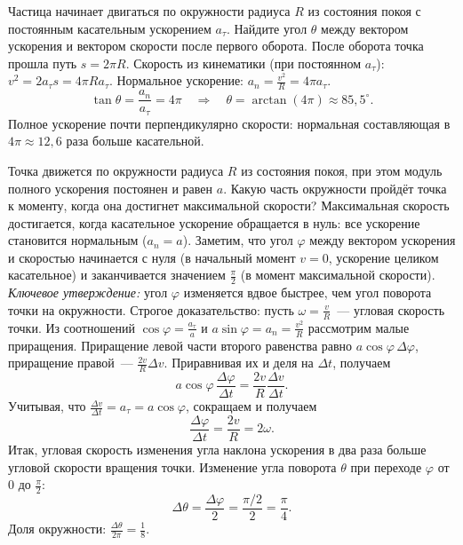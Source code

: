 \documentclass[../main.tex]{subfiles}
\begin{document}
\begin{example}
Частица начинает двигаться по окружности радиуса $R$ из состояния
покоя с постоянным касательным ускорением $a_\tau$.
Найдите угол $\theta$ между вектором ускорения и вектором скорости
после первого оборота.
После оборота точка прошла путь $s = 2\pi R$.
Скорость из кинематики (при постоянном $a_\tau$):
$v^2 = 2a_\tau s = 4\pi R a_\tau$.
Нормальное ускорение: $a_n = \frac{v^2}{R} = 4\pi a_\tau$.
\[
\tan\theta = \frac{a_n}{a_\tau} = 4\pi
\quad\Rightarrow\quad
\theta = \arctan(4\pi) \approx 85{,}5^\circ.
\]
Полное ускорение почти перпендикулярно скорости: нормальная составляющая
в $4\pi \approx 12{,}6$ раза больше касательной.
\end{example}

\begin{example}
Точка движется по окружности радиуса $R$ из состояния покоя,
при этом модуль полного ускорения постоянен и равен $a$.
Какую часть окружности пройдёт точка к моменту, когда она
достигнет максимальной скорости?
Максимальная скорость достигается, когда касательное ускорение
обращается в нуль: все ускорение становится нормальным ($a_n = a$).
Заметим, что угол $\varphi$ между вектором ускорения и скоростью
начинается с нуля (в начальный момент $v = 0$, ускорение целиком касательное)
и заканчивается значением $\frac{\pi}{2}$ (в момент максимальной скорости).
\textit{Ключевое утверждение:} угол $\varphi$ изменяется вдвое быстрее,
чем угол поворота точки на окружности. Строгое доказательство:
пусть $\omega = \frac{v}{R}$~--- угловая скорость точки. Из соотношений
$\cos\varphi = \frac{a_\tau}{a}$ и $a\sin\varphi = a_n = \frac{v^2}{R}$ рассмотрим малые приращения.
Приращение левой части второго равенства равно $a\cos\varphi\,\Delta\varphi$,
приращение правой~--- $\frac{2v}{R}\Delta v$.
Приравнивая их и деля на $\Delta t$, получаем
\[
a\cos\varphi\,\frac{\Delta\varphi}{\Delta t} = \frac{2v}{R}\frac{\Delta v}{\Delta t}.
\]
Учитывая, что $\frac{\Delta v}{\Delta t} = a_\tau = a\cos\varphi$, сокращаем и получаем
\[
\frac{\Delta\varphi}{\Delta t} = \frac{2v}{R} = 2\omega.
\]
Итак, угловая скорость изменения угла наклона ускорения в два раза больше
угловой скорости вращения точки. Изменение угла поворота $\theta$ при переходе
$\varphi$ от $0$ до $\frac{\pi}{2}$:
\[
\Delta\theta = \frac{\Delta\varphi}{2} = \frac{\pi/2}{2} = \frac{\pi}{4}.
\]
Доля окружности: $\frac{\Delta\theta}{2\pi} = \frac{1}{8}$.
\end{example}

\end{document}
